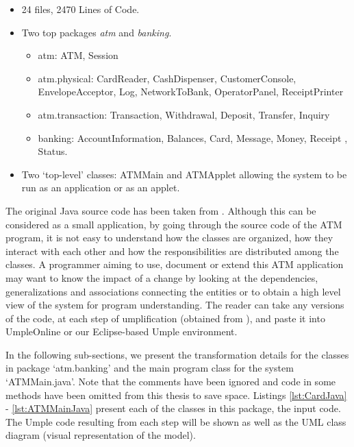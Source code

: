 \begin{itemize}
 \item 24 files, 2470 Lines of Code.
 \item Two top packages \textit{atm} and \textit{banking}.
	\begin{itemize}
	 \item atm: ATM, Session
	 \item atm.physical: CardReader, CashDispenser, CustomerConsole, EnvelopeAcceptor, Log, NetworkToBank, OperatorPanel, ReceiptPrinter
	 \item atm.transaction: Transaction, Withdrawal, Deposit, Transfer, Inquiry
	 \item banking: AccountInformation, Balances, Card, Message, Money, Receipt , Status.
	\end{itemize}
 \item Two `top-level' classes: ATMMain and ATMApplet allowing the system to be run as an application or as an applet.
\end{itemize}

The original Java source code has been taken from \cite{atmsystem}. Although this can be considered as a small application, by going through the source code of the ATM program, it is not easy to understand how the classes are organized, how they interact with each other and how the responsibilities are distributed among the classes. A programmer aiming to use, document or extend this ATM application may want to know the impact of a change by looking at the dependencies, generalizations and associations connecting the entities or to obtain a high level view of the system for program understanding. The reader can take any versions of the code, at each step of umplification (obtained from \cite{UmplificationBasicExampleURL}), and paste it into UmpleOnline \cite{UmpleOnline} or our Eclipse-based Umple environment. 


In the following sub-sections, we present the transformation details for the classes in package `atm.banking' and the main program class for the system `ATMMain.java'. Note that the comments have been ignored and code in some methods have been omitted from this thesis to save space.  Listings \ref{lst:CardJava} - \ref{lst:ATMMainJava} present each of the classes in this package, the input code. The Umple code resulting from each step will be shown as well as the UML class diagram (visual representation of the model). 

